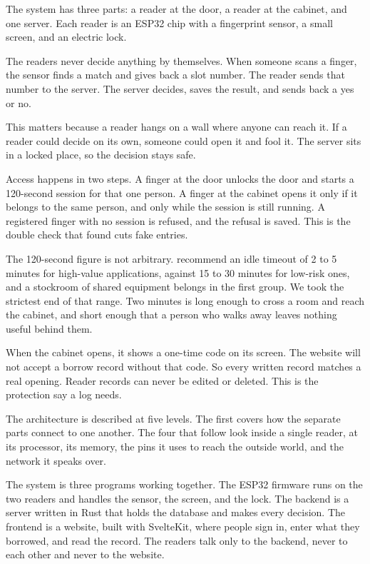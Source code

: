 

The system has three parts: a reader at the door, a reader at the cabinet, and
one server. Each reader is an ESP32 chip with a fingerprint sensor, a small
screen, and an electric lock.

The readers never decide anything by themselves. When someone scans a finger,
the sensor finds a match and gives back a slot number. The reader sends that
number to the server. The server decides, saves the result, and sends back a
yes or no.

This matters because a reader hangs on a wall where anyone can reach it. If a
reader could decide on its own, someone could open it and fool it. The server
sits in a locked place, so the decision stays safe.

Access happens in two steps. A finger at the door unlocks the door and starts a
120-second session for that one person. A finger at the cabinet opens it only if
it belongs to the same person, and only while the session is still running. A
registered finger with no session is refused, and the refusal is saved. This is
the double check that \textcite{mohammed2025} found cuts fake entries.

The 120-second figure is not arbitrary. \textcite{owasp2026} recommend an idle
timeout of 2 to 5 minutes for high-value applications, against 15 to 30 minutes
for low-risk ones, and a stockroom of shared equipment belongs in the first
group. We took the strictest end of that range. Two minutes is long enough to
cross a room and reach the cabinet, and short enough that a person who walks
away leaves nothing useful behind them.

When the cabinet opens, it shows a one-time code on its screen. The website will
not accept a borrow record without that code. So every written record matches a
real opening. Reader records can never be edited or deleted. This is the
protection \textcite{koisser2023} say a log needs.


The architecture is described at five levels. The first covers how the separate parts connect to one another. The four that follow look inside a single reader, at its processor, its memory, the pins it uses to reach the outside world, and the network it speaks over.


The system is three programs working together. The ESP32 firmware runs on the
two readers and handles the sensor, the screen, and the lock. The backend is a
server written in Rust that holds the database and makes every decision. The
frontend is a website, built with SvelteKit, where people sign in, enter what
they borrowed, and read the record. The readers talk only to the backend, never
to each other and never to the website.

